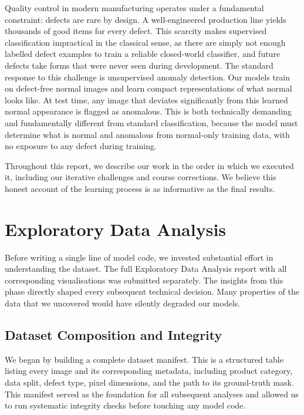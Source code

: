 \documentclass[11pt, a4paper]{article}
\begin{document}
Quality control in modern manufacturing operates under a fundamental constraint: defects are rare by design. A well-engineered production line yields thousands of good items for every defect. This scarcity makes supervised classification impractical in the classical sense, as there are simply not enough labelled defect examples to train a reliable closed-world classifier, and future defects take forms that were never seen during development. The standard response to this challenge is unsupervised anomaly detection. Our models train on defect-free normal images and learn compact representations of what normal looks like. At test time, any image that deviates significantly from this learned normal appearance is flagged as anomalous. This is both technically demanding and fundamentally different from standard classification, because the model must determine what is normal and anomalous from normal-only training data, with no exposure to any defect during training.

Throughout this report, we describe our work in the order in which we executed it, including our iterative challenges and course corrections. We believe this honest account of the learning process is as informative as the final results.

\section{Exploratory Data Analysis}
\label{sec:eda}

Before writing a single line of model code, we invested substantial effort in understanding the dataset. The full Exploratory Data Analysis report with all corresponding visualisations was submitted separately. The insights from this phase directly shaped every subsequent technical decision. Many properties of the data that we uncovered would have silently degraded our models.

\subsection{Dataset Composition and Integrity}

We began by building a complete dataset manifest. This is a structured table listing every image and its corresponding metadata, including product category, data split, defect type, pixel dimensions, and the path to its ground-truth mask. This manifest served as the foundation for all subsequent analyses and allowed us to run systematic integrity checks before touching any model code.
\end{document}
